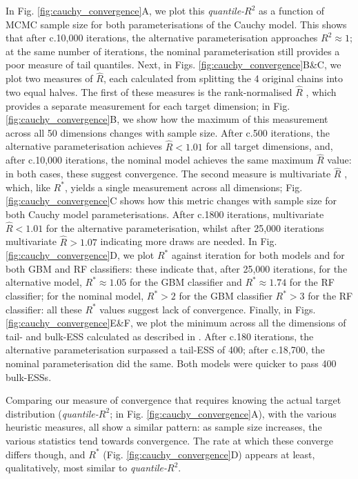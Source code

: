 \documentclass[ba]{imsart}
\numberwithin{equation}{section}
\theoremstyle{plain}
\begin{document}
In Fig. \ref{fig:cauchy_convergence}A, we plot this \textit{quantile-$R^2$} as a function of MCMC sample size for both parameterisations of the Cauchy model. This shows that after c.10,000 iterations, the alternative parameterisation approaches $R^2\approx 1$; at the same number of iterations, the nominal parameterisation still provides a poor measure of tail quantiles. Next, in Figs. \ref{fig:cauchy_convergence}B\&C, we plot two measures of $\widehat{R}$, each calculated from splitting the 4 original chains into two equal halves. The first of these measures is the rank-normalised $\widehat{R}$ \citep{vehtari2019rank}, which provides a separate measurement for each target dimension; in Fig. \ref{fig:cauchy_convergence}B, we show how the maximum of this measurement across all 50 dimensions changes with sample size. After c.500 iterations, the alternative parameterisation achieves $\widehat{R}<1.01$ for all target dimensions, and, after c.10,000 iterations, the nominal model achieves the same maximum $\widehat{R}$ value: in both cases, these suggest convergence. The second measure is multivariate $\widehat{R}$ \citep{brooks1998general}, which, like $R^*$, yields a single measurement across all dimensions; Fig. \ref{fig:cauchy_convergence}C shows how this metric changes with sample size for both Cauchy model parameterisations. After c.1800 iterations, multivariate $\widehat{R}<1.01$ for the alternative parameterisation, whilst after 25,000 iterations multivariate $\widehat{R}>1.07$ indicating more draws are needed. In Fig. \ref{fig:cauchy_convergence}D, we plot $R^*$ against iteration for both models and for both GBM and RF classifiers: these indicate that, after 25,000 iterations, for the alternative model, $R^*\approx 1.05$ for the GBM classifier and $R^*\approx 1.74$ for the RF classifier; for the nominal model, $R^*>2$ for the GBM classifier $R^*>3$ for the RF classifier: all these $R^*$ values suggest lack of convergence. Finally, in Figs. \ref{fig:cauchy_convergence}E\&F, we plot the minimum across all the dimensions of tail- and bulk-ESS calculated as described in \cite{vehtari2019rank}. After c.180 iterations, the alternative parameterisation surpassed a tail-ESS of 400; after c.18,700, the nominal parameterisation did the same. Both models were quicker to pass 400 bulk-ESSs.

Comparing our measure of convergence that requires knowing the actual target distribution (\textit{quantile-$R^2$}; in Fig. \ref{fig:cauchy_convergence}A), with the various heuristic measures, all show a similar pattern: as sample size increases, the various statistics tend towards convergence. The rate at which these converge differs though, and $R^*$ (Fig. \ref{fig:cauchy_convergence}D) appears at least, qualitatively, most similar to \textit{quantile-$R^2$}.
\end{document}

